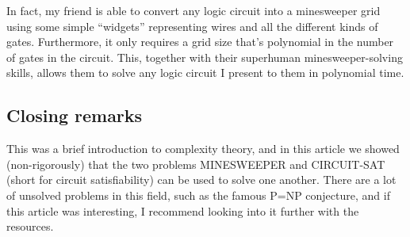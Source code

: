 \documentclass{article}
\begin{document}
In fact, my friend is able to convert any logic circuit into a minesweeper grid using some simple “widgets” representing wires and all the different kinds of gates. Furthermore, it only requires a grid size that’s polynomial in the number of gates in the circuit. This, together with their superhuman minesweeper-solving skills, allows them to solve any logic circuit I present to them in polynomial time.


\subsection{Closing remarks}

This was a brief introduction to complexity theory, and in this article we showed (non-rigorously) that the two problems MINESWEEPER and CIRCUIT-SAT (short for circuit satisfiability) can be used to solve one another. There are a lot of unsolved problems in this field, such as the famous P=NP conjecture, and if this article was interesting, I recommend looking into it further with the resources.
\end{document}
